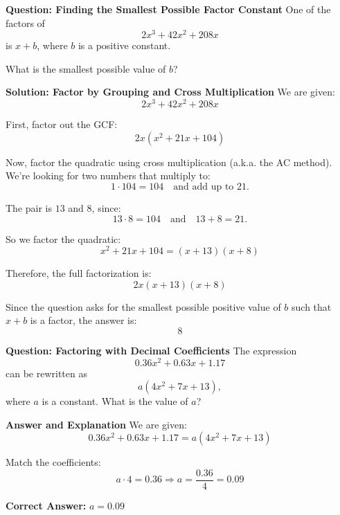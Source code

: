 \documentclass{beamer}
\begin{document}
\begin{frame}{\textbf{Question: Finding the Smallest Possible Factor Constant}}
One of the factors of 
\[
2x^3 + 42x^2 + 208x
\]
is \(x + b\), where \(b\) is a positive constant.

\bigskip
What is the smallest possible value of \(b\)?
\end{frame}

\begin{frame}{\textbf{Solution: Factor by Grouping and Cross Multiplication}}
\scriptsize
We are given:
\[
2x^3 + 42x^2 + 208x
\]

First, factor out the GCF:
\[
2x(x^2 + 21x + 104)
\]

Now, factor the quadratic using cross multiplication (a.k.a. the AC method). We're looking for two numbers that multiply to:
\[
1 \cdot 104 = 104 \quad \text{and add up to } 21.
\]

The pair is \(13\) and \(8\), since:
\[
13 \cdot 8 = 104 \quad \text{and} \quad 13 + 8 = 21.
\]

So we factor the quadratic:
\[
x^2 + 21x + 104 = (x + 13)(x + 8)
\]

Therefore, the full factorization is:
\[
2x(x + 13)(x + 8)
\]

Since the question asks for the smallest possible positive value of \(b\) such that \(x + b\) is a factor, the answer is:
\[
\boxed{8}
\]
\end{frame}

\begin{frame}{\textbf{Question: Factoring with Decimal Coefficients}}
The expression 
\[
0.36x^2 + 0.63x + 1.17
\]
can be rewritten as 
\[
a(4x^2 + 7x + 13),
\]
where $a$ is a constant. What is the value of $a$?
\end{frame}

\begin{frame}{\textbf{Answer and Explanation}}
We are given:
\[
0.36x^2 + 0.63x + 1.17 = a(4x^2 + 7x + 13)
\]

Match the coefficients:
\[
a \cdot 4 = 0.36 \Rightarrow a = \frac{0.36}{4} = 0.09
\]

\textbf{Correct Answer:} $a = \boxed{0.09}$
\end{frame}
\end{document}
